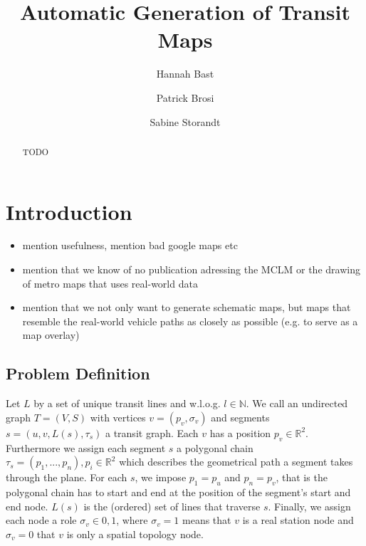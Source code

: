 \documentclass{llncs}
\begin{document}
%
\mainmatter              %
%
\title{Automatic Generation of Transit Maps}
%
%
\author{Hannah Bast \and Patrick Brosi \and
Sabine Storandt}
%
%
%

\maketitle              %

\begin{abstract}
TODO
\end{abstract}
%
\section{Introduction}
%

\begin{itemize}
\item mention usefulness, mention bad google maps etc
\item mention that we know of no publication adressing the MCLM or the drawing of metro maps that uses real-world data
\item mention that we not only want to generate schematic maps, but maps that resemble the real-world vehicle paths as closely as possible (e.g. to serve as a map overlay)
\end{itemize}

\subsection{Problem Definition}

Let $L$ by a set of unique transit lines and w.l.o.g. $l \in \mathbb{N}$. We call an undirected graph $T = (V, S)$ with vertices $v = (p_v, \sigma_v)$ and segments $s = (u, v, L(s), \tau_s)$ a transit graph. Each $v$ has a position $p_v \in \mathbb{R}^2$. Furthermore we assign each segment $s$ a polygonal chain $\tau_s = (p_1, ..., p_n), p_i \in \mathbb{R}^2$ which describes the geometrical path a segment takes through the plane. For each $s$, we impose $p_1 = p_u$ and $p_n = p_v$, that is the polygonal chain has to start and end at the position of the segment's start and end node. $L(s)$ is the (ordered) set of lines that traverse $s$. Finally, we assign each node a role $\sigma_v \in {0, 1}$, where $\sigma_v = 1$ means that $v$ is a real station node and $\sigma_v = 0$ that $v$ is only a spatial topology node.
\end{document}
